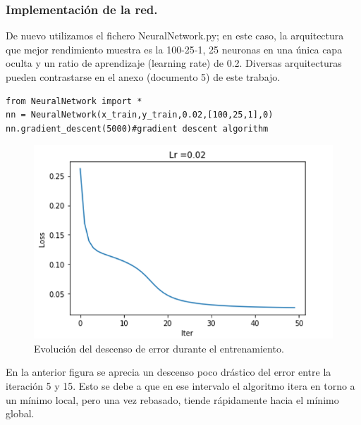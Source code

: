\documentclass[a4paper,11pt]{article}
\begin{document}
\subsubsection{Implementación de la red.}
De nuevo utilizamos el fichero NeuralNetwork.py; en este caso, la  arquitectura  que mejor rendimiento muestra es la 100-25-1, 25 neuronas en una única capa oculta y un ratio de aprendizaje (learning rate) de 0.2. Diversas arquitecturas pueden contrastarse en el anexo (documento 5) de este trabajo.
\begin{lstlisting}
from NeuralNetwork import * 
nn = NeuralNetwork(x_train,y_train,0.02,[100,25,1],0)
nn.gradient_descent(5000)#gradient descent algorithm
\end{lstlisting}
\begin{figure}[H]
	\centering
	\includegraphics[scale=0.6]{Annotation 2020-03-23171823}
\caption{Evolución del descenso de error durante el entrenamiento.}
\end{figure}
\noindent
En la anterior figura se aprecia un descenso poco drástico del error entre la iteración 5 y 15. Esto se debe a que en ese intervalo el algoritmo itera en torno a un mínimo local, pero una vez rebasado, tiende rápidamente hacia el mínimo global. 
\end{document}
